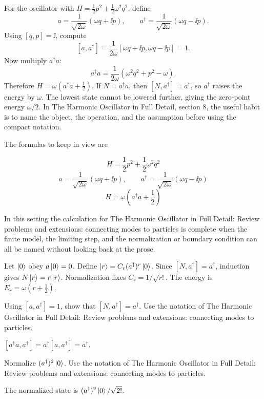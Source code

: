 For the oscillator with \(H=\frac12p^2+\frac12\omega^2q^2\), define
\[
  a=\frac{1}{\sqrt{2\omega}}(\omega q+\ii p),\qquad
  a^\dagger=\frac{1}{\sqrt{2\omega}}(\omega q-\ii p).
\]
Using \([q,p]=\ii\), compute
\[
  [a,a^\dagger]
  =
  \frac{1}{2\omega}[\omega q+\ii p,\omega q-\ii p]=1.
\]
Now multiply \(a^\dagger a\):
\[
  a^\dagger a=\frac{1}{2\omega}(\omega^2q^2+p^2-\omega).
\]
Therefore \(H=\omega(a^\dagger a+\frac12)\).  If \(N=a^\dagger a\), then \([N,a^\dagger]=a^\dagger\), so \(a^\dagger\) raises the energy by \(\omega\).  The lowest state cannot be lowered further, giving the zero-point energy \(\omega/2\).  In The Harmonic Oscillator in Full Detail, section 8, the useful habit is to name the object, the operation, and the assumption before using the compact notation.

The formulas to keep in view are

\[
  H=\frac12p^2+\frac12\omega^2q^2
\]
\[
  a=\frac{1}{\sqrt{2\omega}}(\omega q+\ii p),\qquad a^\dagger=\frac{1}{\sqrt{2\omega}}(\omega q-\ii p)
\]
\[
  H=\omega\left(a^\dagger a+\frac12\right)
\]

In this setting the calculation for The Harmonic Oscillator in Full Detail: Review problems and extensions: connecting modes to particles is complete when the finite model, the limiting step, and the normalization or boundary condition can all be named without looking back at the prose.




\begin{example}
Let \(\left|0\right\rangle\) obey \(a\left|0\right\rangle=0\).  Define \(\left|r\right\rangle=C_r(a^\dagger)^r\left|0\right\rangle\).  Since \([N,a^\dagger]=a^\dagger\), induction gives \(N\left|r\right\rangle=r\left|r\right\rangle\).  Normalization fixes \(C_r=1/\sqrt{r!}\).  The energy is \(E_r=\omega(r+\frac12)\).
\end{example}



\begin{exercise}
Using \([a,a^\dagger]=1\), show that \([N,a^\dagger]=a^\dagger\).  Use the notation of The Harmonic Oscillator in Full Detail: Review problems and extensions: connecting modes to particles.
\begin{answer}
\([a^\dagger a,a^\dagger]=a^\dagger[a,a^\dagger]=a^\dagger\).
\end{answer}
\end{exercise}

\begin{exercise}
Normalize \((a^\dagger)^2\left|0\right\rangle\).  Use the notation of The Harmonic Oscillator in Full Detail: Review problems and extensions: connecting modes to particles.
\begin{answer}
The normalized state is \((a^\dagger)^2\left|0\right\rangle/\sqrt{2!}\).
\end{answer}
\end{exercise}



